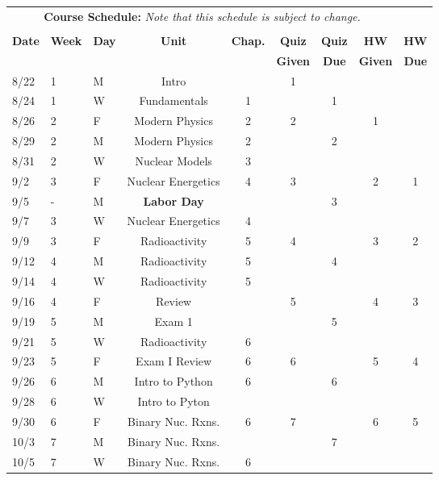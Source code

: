 \documentclass[11pt, a4paper]{article}
\begin{document}
\pagebreak
\FloatBarrier
\renewcommand{\arraystretch}{1}
\begin{table}[h]
\begin{center}
\begin{tabular}{lllcccccc}
\multicolumn{8}{c}{\textbf{Course Schedule:}\textit{ Note that this schedule is
subject to change.}}\\
&&&&&&&&\\
\textbf{Date} & \textbf{Week} & \textbf{Day} & \textbf{Unit} & \textbf{Chap.} & \textbf{Quiz}& \textbf{Quiz} & \textbf{HW} & \textbf{HW}\\
              &  &  &  &  & \textbf{Given} & \textbf{Due} & \textbf{Given} & \textbf{Due}\\ \hline
\hline
8/22 & 1 & M & Intro              &  & 1 &  &  & \\
8/24 & 1 & W & Fundamentals       & 1 &  & 1 & &  \\
8/26 & 2 & F & Modern Physics     & 2 & 2  &  & 1 &  \\
8/29 & 2 & M & Modern Physics     & 2 &   & 2 &  &  \\
8/31 & 2 & W & Nuclear Models     & 3 &  &  &  &   \\
9/2 & 3 & F & Nuclear Energetics & 4 & 3  &  & 2 & 1 \\
9/5 & - & M & \textbf{Labor Day}  &  & & 3 & &  \\
9/7 & 3 & W & Nuclear Energetics  & 4 &   &  &  &  \\
9/9 & 3 & F & Radioactivity       & 5 & 4 &  & 3 & 2 \\
9/12 & 4 & M & Radioactivity       & 5 &   & 4 &  &  \\
9/14 & 4 & W & Radioactivity       & 5 &   &  &  &  \\
9/16 & 4 & F & Review             &   & 5 &  & 4 & 3 \\
9/19 & 5 & M & Exam 1             &   &   & 5  &  &  \\
9/21 & 5 & W & Radioactivity  & 6 &   &  &  &  \\
9/23 & 5 & F & Exam I Review  & 6 & 6 &  & 5 & 4 \\
9/26 & 6 & M & Intro to Python  & 6 &   & 6 &  &  \\
9/28 & 6 & W & Intro to Pyton      &  &  &  &  &  \\
9/30 & 6 & F & Binary Nuc. Rxns.  & 6 & 7 &  & 6 & 5  \\
10/3 & 7 & M & Binary Nuc. Rxns. &  &  & 7 &  &  \\
10/5 & 7 & W & Binary Nuc. Rxns.  & 6 &  &  &  &  \\

\end{tabular}
\end{center}
\end{table}
\end{document}
